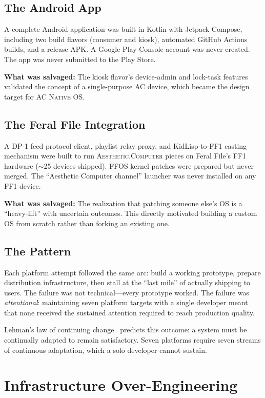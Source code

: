 \documentclass[10pt,letterpaper,twocolumn]{article}
\newcommand{\ac}{\textsc{Aesthetic.Computer}}
\newcommand{\acos}{\textsc{AC Native OS}}
\begin{document}
\subsection{The Android App}

A complete Android application was built in Kotlin with Jetpack Compose, including two build flavors (consumer and kiosk), automated GitHub Actions builds, and a release APK. A Google Play Console account was never created. The app was never submitted to the Play Store.

\textbf{What was salvaged:} The kiosk flavor's device-admin and lock-task features validated the concept of a single-purpose AC device, which became the design target for \acos{}.

\subsection{The Feral File Integration}

A DP-1 feed protocol client, playlist relay proxy, and KidLisp-to-FF1 casting mechanism were built to run \ac{} pieces on Feral File's FF1 hardware ($\sim$25 devices shipped). FFOS kernel patches were prepared but never merged. The ``Aesthetic Computer channel'' launcher was never installed on any FF1 device.

\textbf{What was salvaged:} The realization that patching someone else's OS is a ``heavy-lift'' with uncertain outcomes. This directly motivated building a custom OS from scratch rather than forking an existing one.

\subsection{The Pattern}

Each platform attempt followed the same arc: build a working prototype, prepare distribution infrastructure, then stall at the ``last mile'' of actually shipping to users. The failure was not technical---every prototype worked. The failure was \emph{attentional}: maintaining seven platform targets with a single developer meant that none received the sustained attention required to reach production quality.

Lehman's law of continuing change~\citep{lehman1980programs} predicts this outcome: a system must be continually adapted to remain satisfactory. Seven platforms require seven streams of continuous adaptation, which a solo developer cannot sustain.

\section{Infrastructure Over-Engineering}
\end{document}
